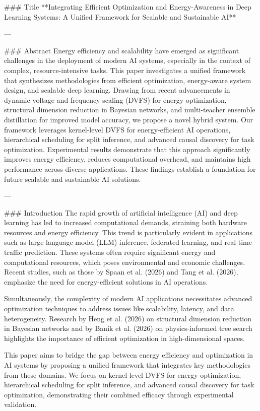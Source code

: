 ### Title  
**Integrating Efficient Optimization and Energy-Awareness in Deep Learning Systems: A Unified Framework for Scalable and Sustainable AI**

---

### Abstract  
Energy efficiency and scalability have emerged as significant challenges in the deployment of modern AI systems, especially in the context of complex, resource-intensive tasks. This paper investigates a unified framework that synthesizes methodologies from efficient optimization, energy-aware system design, and scalable deep learning. Drawing from recent advancements in dynamic voltage and frequency scaling (DVFS) for energy optimization, structural dimension reduction in Bayesian networks, and multi-teacher ensemble distillation for improved model accuracy, we propose a novel hybrid system. Our framework leverages kernel-level DVFS for energy-efficient AI operations, hierarchical scheduling for split inference, and advanced causal discovery for task optimization. Experimental results demonstrate that this approach significantly improves energy efficiency, reduces computational overhead, and maintains high performance across diverse applications. These findings establish a foundation for future scalable and sustainable AI solutions.

---

### Introduction  
The rapid growth of artificial intelligence (AI) and deep learning has led to increased computational demands, straining both hardware resources and energy efficiency. This trend is particularly evident in applications such as large language model (LLM) inference, federated learning, and real-time traffic prediction. These systems often require significant energy and computational resources, which poses environmental and economic challenges. Recent studies, such as those by Spaan et al. (2026) and Tang et al. (2026), emphasize the need for energy-efficient solutions in AI operations.

Simultaneously, the complexity of modern AI applications necessitates advanced optimization techniques to address issues like scalability, latency, and data heterogeneity. Research by Heng et al. (2026) on structural dimension reduction in Bayesian networks and by Banik et al. (2026) on physics-informed tree search highlights the importance of efficient optimization in high-dimensional spaces.

This paper aims to bridge the gap between energy efficiency and optimization in AI systems by proposing a unified framework that integrates key methodologies from these domains. We focus on kernel-level DVFS for energy optimization, hierarchical scheduling for split inference, and advanced causal discovery for task optimization, demonstrating their combined efficacy through experimental validation.

